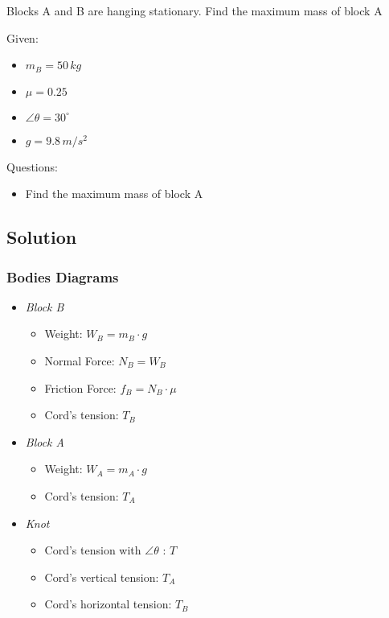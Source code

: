 Blocks A and B are hanging stationary. Find the maximum mass of block A

\bigbreak Given:

\begin{itemize}
    \item $ m_B = 50\,kg $
    \item $ \mu = 0.25 $  
    \item $ \angle \theta = 30^{\circ} $
    \item $ g = 9.8\,m/s^2 $
\end{itemize}

\bigbreak Questions:
\begin{itemize}
    \item Find the maximum mass of block A
\end{itemize}


\subsection*{Solution}
\subsubsection*{Bodies Diagrams}
\begin{itemize}
    \item \textit{Block B} \begin{itemize}
        \item Weight: $W_B = m_B \cdot g$
        \item Normal Force: $N_B = W_B$
        \item Friction Force: $f_B = N_B \cdot \mu$
        \item Cord's tension: $T_B$
    \end{itemize}

    \item \textit{Block A} \begin{itemize}
        \item Weight: $W_A = m_A \cdot g$
        \item Cord's tension: $T_A$
    \end{itemize}

    \item \textit{Knot} \begin{itemize}
        \item Cord's tension with $\angle \theta$ : $T$
        \item Cord's vertical tension: $T_A$
        \item Cord's horizontal tension: $T_B$
    \end{itemize}
\end{itemize}

